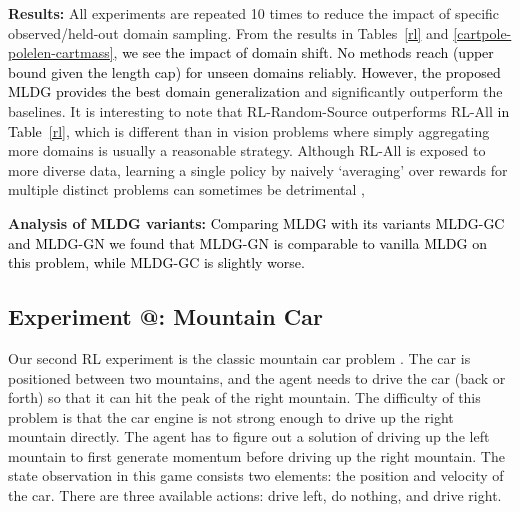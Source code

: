 \documentclass[letterpaper]{article} \usepackage{aaai18}  \usepackage{times}  \usepackage{helvet}  \usepackage{courier}  \usepackage{url}  \usepackage{graphicx}  \usepackage{amsmath}
\makeatletter
\newcommand*{\rom}[1]{\expandafter\@slowromancap\romannumeral #1@}
\newcommand{\keypoint}[1]{\vspace{0.1cm}\noindent\textbf{#1}\quad}
\makeatother
\begin{document}
{\begin{table}[t]
\centering
\caption{Cart-Pole RL. Generalisation performance across both pole length and cart mass. Return testing on 3 held out domains with random length and mass. Upper bound: 200.}
\label{cartpole-polelen-cartmass}
\end{table}

\keypoint{Results:} All experiments are repeated 10 times to reduce the impact of specific observed/held-out domain sampling. From the results in Tables~\ref{rl} and \ref{cartpole-polelen-cartmass}, \textcolor{black}{we  see the impact of domain shift. No methods reach  (upper bound given the length cap) for  unseen domains reliably. However, the proposed MLDG provides the best domain generalization} and  significantly outperform the baselines. It is interesting to note that RL-Random-Source outperforms RL-All \textcolor{black}{in Table~\ref{rl}}, which is different than in vision problems where simply aggregating more domains is usually a reasonable strategy. Although RL-All is exposed to more diverse data, learning a single policy by naively `averaging' over rewards for multiple distinct problems can sometimes be detrimental \cite{yang2017metacritic}, 

\keypoint{Analysis of MLDG variants:} \textcolor{black}{Comparing MLDG with its variants MLDG-GC and MLDG-GN we found that MLDG-GN is comparable to vanilla MLDG on this problem, while MLDG-GC is slightly worse. }

\subsection{Experiment \rom{4}: Mountain Car}

Our second RL experiment is the classic mountain car problem \cite{openaigym}. The car is positioned between two mountains, and the agent needs to drive the car (back or forth) so that it can hit the peak of the right mountain. The difficulty of this problem is that the car engine is not strong enough to drive up the right mountain directly. The agent has to figure out a solution of driving up the left mountain to first generate momentum before driving up the right mountain. The state observation in this game consists two elements: the position and velocity of the car. There are three available actions: drive left, do nothing, and drive right.

}
\end{document}
